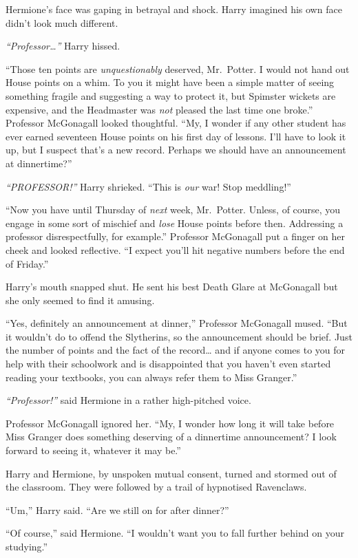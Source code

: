 Hermione's face was gaping in betrayal and shock. Harry imagined his own
face didn't look much different.

\emph{``Professor\ldots{}''} Harry hissed.

``Those ten points are \emph{unquestionably} deserved, Mr.~Potter. I
would not hand out House points on a whim. To you it might have been a
simple matter of seeing something fragile and suggesting a way to
protect it, but Spimster wickets are expensive, and the Headmaster was
\emph{not} pleased the last time one broke.'' Professor McGonagall
looked thoughtful. ``My, I wonder if any other student has ever earned
seventeen House points on his first day of lessons. I'll have to look it
up, but I suspect that's a new record. Perhaps we should have an
announcement at dinnertime?''

\emph{``PROFESSOR!''} Harry shrieked. ``This is \emph{our} war! Stop
meddling!''

``Now you have until Thursday of \emph{next} week, Mr.~Potter. Unless,
of course, you engage in some sort of mischief and \emph{lose} House
points before then. Addressing a professor disrespectfully, for
example.'' Professor McGonagall put a finger on her cheek and looked
reflective. ``I expect you'll hit negative numbers before the end of
Friday.''

Harry's mouth snapped shut. He sent his best Death Glare at McGonagall
but she only seemed to find it amusing.

``Yes, definitely an announcement at dinner,'' Professor McGonagall
mused. ``But it wouldn't do to offend the Slytherins, so the
announcement should be brief. Just the number of points and the fact of
the record\ldots{} and if anyone comes to you for help with their
schoolwork and is disappointed that you haven't even started reading
your textbooks, you can always refer them to Miss Granger.''

\emph{``Professor!''} said Hermione in a rather high-pitched voice.

Professor McGonagall ignored her. ``My, I wonder how long it will take
before Miss Granger does something deserving of a dinnertime
announcement? I look forward to seeing it, whatever it may be.''

Harry and Hermione, by unspoken mutual consent, turned and stormed out
of the classroom. They were followed by a trail of hypnotised
Ravenclaws.

``Um,'' Harry said. ``Are we still on for after dinner?''

``Of course,'' said Hermione. ``I wouldn't want you to fall further
behind on your studying.''

